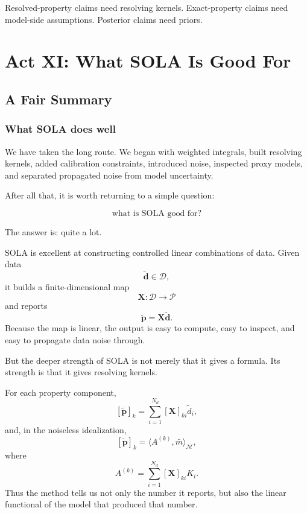 \documentclass[11pt,openany]{book}
\theoremstyle{definition}
\theoremstyle{remark}
\newcommand{\M}{\mathcal M}
\newcommand{\D}{\mathcal D}
\newcommand{\Pspace}{\mathcal P}
\begin{document}
\begin{checkpointbox}
Resolved-property claims need resolving kernels. Exact-property claims need model-side
assumptions. Posterior claims need priors.
\end{checkpointbox}


\part{Act XI: What SOLA Is Good For}

\chapter{A Fair Summary}

\section{What SOLA does well}

We have taken the long route. We began with weighted integrals, built resolving kernels, added
calibration constraints, introduced noise, inspected proxy models, and separated propagated
noise from model uncertainty.

After all that, it is worth returning to a simple question:

\[
  \text{what is SOLA good for?}
\]

The answer is: quite a lot.

SOLA is excellent at constructing controlled linear combinations of data. Given data
\[
  \widetilde{\mathbf d}\in\D,
\]
it builds a finite-dimensional map
\[
  \mathbf X:\D\to\Pspace
\]
and reports
\[
  \widetilde{\mathbf p}
  =
  \mathbf X\widetilde{\mathbf d}.
\]
Because the map is linear, the output is easy to compute, easy to inspect, and easy to propagate
data noise through.

But the deeper strength of SOLA is not merely that it gives a formula. Its strength is that it
gives resolving kernels.

For each property component,
\[
  [\widetilde{\mathbf p}]_k
  =
  \sum_{i=1}^{N_d}[\mathbf X]_{ki}\widetilde d_i,
\]
and, in the noiseless idealization,
\[
  [\widetilde{\mathbf p}]_k
  =
  \langle A^{(k)},\bar m\rangle_{\M},
\]
where
\[
  A^{(k)}
  =
  \sum_{i=1}^{N_d}[\mathbf X]_{ki}K_i.
\]
Thus the method tells us not only the number it reports, but also the linear functional of the
model that produced that number.
\end{document}
